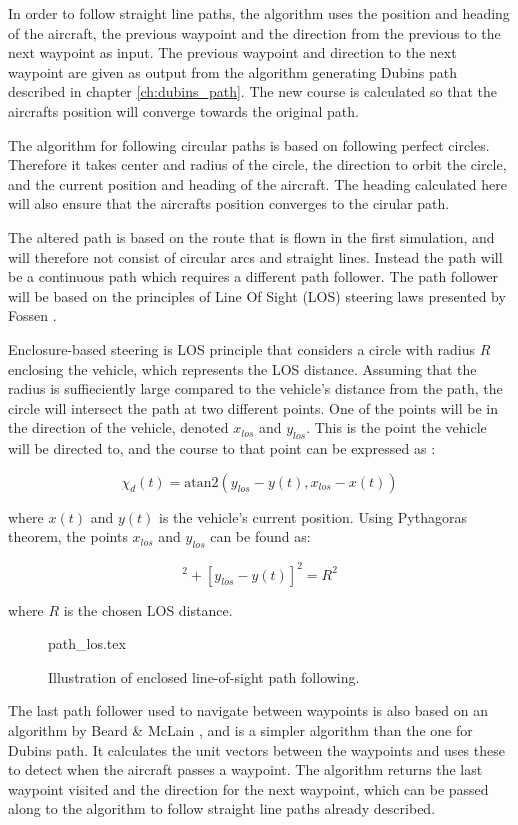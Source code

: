 In order to follow straight line paths, the algorithm uses the position and heading of the aircraft, the previous waypoint and the direction from the previous to the next waypoint as input. The previous waypoint and direction to the next waypoint are given as output from the algorithm generating Dubins path described in chapter \ref{ch:dubins_path}. The new course is calculated so that the aircrafts position will converge towards the original path.

The algorithm for following circular paths is based on following perfect circles. Therefore it takes center and radius of the circle, the direction to orbit the circle, and the current position and heading of the aircraft. The heading calculated here will also ensure that the aircrafts position converges to the cirular path.

The altered path is based on the route that is flown in the first simulation, and will therefore not consist of circular arcs and straight lines. Instead the path will be a continuous path which requires a different path follower. The path follower will be based on the principles of Line Of Sight (LOS) steering laws presented by Fossen \cite{fartoyFOSSEN}.

Enclosure-based steering is LOS principle that considers a circle with radius $R$ enclosing the vehicle, which represents the LOS distance. Assuming that the radius is suffieciently large compared to the vehicle's distance from the path, the circle will intersect the path at two different points. One of the points will be in the direction of the vehicle, denoted $x_{los}$ and $y_{los}$. This is the point the vehicle will be directed to, and the course to that point can be expressed as \cite{fartoyFOSSEN}:

\begin{equation}
	\chi_d(t) = \text{atan2}(y_{los} - y(t), x_{los} - x(t))
\end{equation}

where $x(t)$ and $y(t)$ is the vehicle's current position. Using Pythagoras theorem, the points $x_{los}$ and $y_{los}$ can be found as:

\begin{equation}
	[x_{los} - x(t)]^2 + [y_{los} - y(t)]^2 = R^2
\end{equation}

where $R$ is the chosen LOS distance.

\begin{figure}
	{path_los.tex}
	\caption{Illustration of enclosed line-of-sight path following.}
	\label{fig:path_los}
\end{figure}

The last path follower used to navigate between waypoints is also based on an algorithm by Beard \& McLain \cite{suaBEARD}, and is a simpler algorithm than the one for Dubins path. It calculates the unit vectors between the waypoints and uses these to detect when the aircraft passes a waypoint. The algorithm returns the last waypoint visited and the direction for the next waypoint, which can be passed along to the algorithm to follow straight line paths already described.